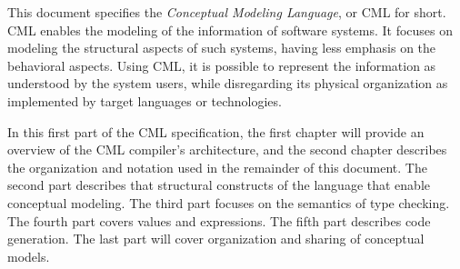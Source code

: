 This document specifies the \emph{Conceptual Modeling Language}, or CML for short.
CML enables the modeling of the information of software systems.
It focuses on modeling the structural aspects of such systems,
having less emphasis on the behavioral aspects.
Using CML,
it is possible to represent the information as understood by the system users,
while disregarding its physical organization as implemented by target languages or technologies.

In this first part of the CML specification,
the first chapter will provide an overview of the CML compiler's architecture,
and the second chapter describes the organization and notation
used in the remainder of this document.
The second part describes that structural constructs of the language
that enable conceptual modeling.
The third part focuses on the semantics of type checking.
The fourth part covers values and expressions.
The fifth part describes code generation.
The last part will cover organization and sharing of conceptual models.
